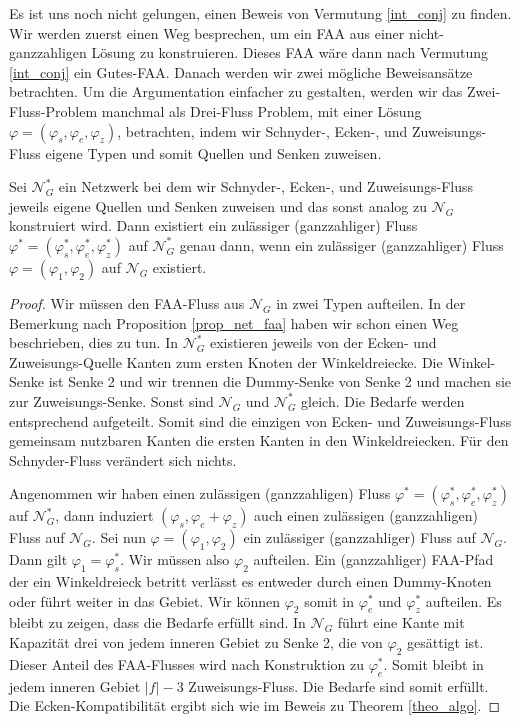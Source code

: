 Es ist uns noch nicht gelungen, einen Beweis von Vermutung \ref{int_conj} zu finden. Wir werden zuerst einen Weg besprechen, um ein FAA aus einer nicht-ganzzahligen Lösung zu konstruieren. Dieses FAA wäre dann nach Vermutung \ref{int_conj} ein Gutes-FAA. Danach werden wir zwei mögliche Beweisansätze betrachten. Um die Argumentation einfacher zu gestalten, werden wir das Zwei-Fluss-Problem manchmal als Drei-Fluss Problem, mit einer Lösung $\varphi=(\varphi_s,\varphi_e,\varphi_z)$, betrachten, indem wir Schnyder-, Ecken-, und Zuweisungs-Fluss eigene Typen und somit Quellen und Senken zuweisen.

\begin{proposition}
Sei $\mathcal{N}^*_G$ ein Netzwerk bei dem wir Schnyder-, Ecken-, und Zuweisungs-Fluss jeweils eigene Quellen und Senken zuweisen und das sonst analog zu $\mathcal{N}_G$ konstruiert wird. Dann existiert ein zulässiger (ganzzahliger) Fluss $\varphi^*=(\varphi^*_s,\varphi^*_e,\varphi^*_z)$ auf $\mathcal{N}^*_G$ genau dann, wenn ein zulässiger (ganzzahliger) Fluss $\varphi=(\varphi_1,\varphi_2)$ auf 
$\mathcal{N}_G$ existiert.
\end{proposition}

\begin{proof}
Wir müssen den FAA-Fluss aus $\mathcal{N}_G$ in zwei Typen aufteilen. In der Bemerkung nach Proposition \ref{prop_net_faa} haben wir schon einen Weg beschrieben, dies zu tun. In $\mathcal{N}_G^*$ existieren jeweils von der Ecken- und Zuweisungs-Quelle Kanten zum ersten Knoten der Winkeldreiecke. Die Winkel-Senke ist Senke 2 und wir trennen die Dummy-Senke von Senke 2 und machen sie zur Zuweisungs-Senke. Sonst sind $\mathcal{N}_G$ und $\mathcal{N}^*_G$ gleich. Die Bedarfe werden entsprechend aufgeteilt. Somit sind die einzigen von Ecken- und Zuweisungs-Fluss gemeinsam nutzbaren Kanten die ersten Kanten in den Winkeldreiecken. Für den Schnyder-Fluss verändert sich nichts.

Angenommen wir haben einen zulässigen (ganzzahligen) Fluss $\varphi^*=(\varphi^*_s,\varphi^*_e,\varphi^*_z)$ auf $\mathcal{N}_G^*$, dann induziert $(\varphi_s,\varphi_e+\varphi_z)$ auch einen zulässigen (ganzzahligen) Fluss auf $\mathcal{N}_G$. Sei nun $\varphi=(\varphi_1,\varphi_2)$ ein zulässiger (ganzzahliger) Fluss auf $\mathcal{N}_G$. Dann gilt $\varphi_1 = \varphi^*_s$. Wir müssen also $\varphi_2$ aufteilen. Ein (ganzzahliger) FAA-Pfad der ein Winkeldreieck betritt verlässt es entweder durch einen Dummy-Knoten oder führt weiter in das Gebiet. Wir können $\varphi_2$ somit in $\varphi_e^*$ und $\varphi_z^*$ aufteilen. Es bleibt zu zeigen, dass die Bedarfe erfüllt sind. In $\mathcal{N}_G$ führt eine Kante mit Kapazität drei von jedem inneren Gebiet zu Senke 2, die von $\varphi_2$ gesättigt ist. Dieser Anteil des FAA-Flusses wird nach Konstruktion zu $\varphi_e^*$. Somit bleibt in jedem inneren Gebiet $|f|-3$ Zuweisungs-Fluss. Die Bedarfe sind somit erfüllt. Die Ecken-Kompatibilität ergibt sich wie im Beweis zu Theorem \ref{theo_algo}.
\end{proof}

